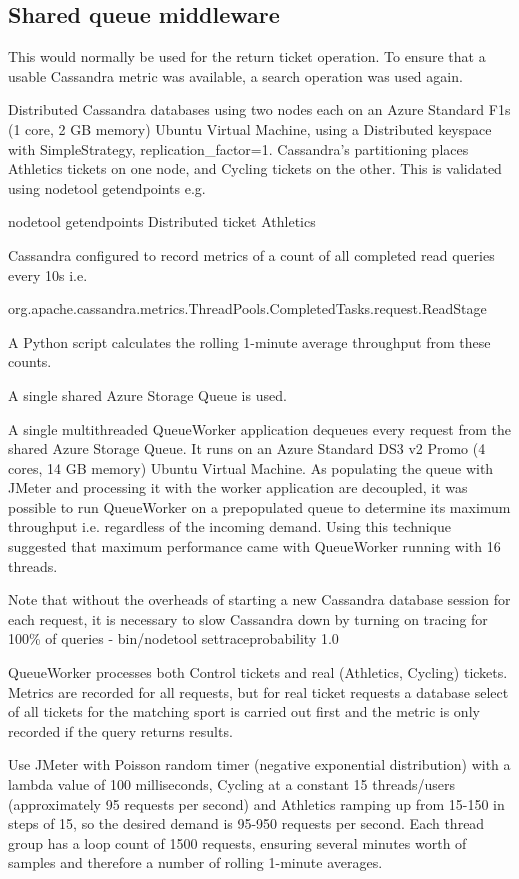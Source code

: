\subsection{Shared queue middleware}
\begin{shaded}
This would normally be used for the return ticket operation.  To ensure that a usable Cassandra metric was available, a search operation was used again.

Distributed Cassandra databases using two nodes each on an Azure Standard F1s (1 core, 2 GB memory) Ubuntu Virtual Machine, using a Distributed keyspace with SimpleStrategy, replication\_factor=1.  Cassandra's partitioning places Athletics tickets on one node, and Cycling tickets on the other.  This is validated using nodetool getendpoints e.g.

nodetool getendpoints Distributed ticket Athletics

Cassandra configured to record metrics of a count of all completed read queries every 10s i.e.

org.apache.cassandra.metrics.ThreadPools.CompletedTasks.request.ReadStage

A Python script calculates the rolling 1-minute average throughput from these counts.

A single shared Azure Storage Queue is used.

A single multithreaded QueueWorker application dequeues every request from the shared Azure Storage Queue.  It runs on an Azure Standard DS3 v2 Promo (4 cores, 14 GB memory) Ubuntu Virtual Machine.  As populating the queue with JMeter and processing it with the worker application are decoupled, it was possible to run QueueWorker on a prepopulated queue to determine its maximum throughput i.e. regardless of the incoming demand. Using this technique suggested that maximum performance came with QueueWorker running with 16 threads.

Note that without the overheads of starting a new Cassandra database session for each request, it is necessary to slow Cassandra down by turning on tracing for 100\% of queries - bin/nodetool settraceprobability 1.0

QueueWorker processes both Control tickets and real (Athletics, Cycling) tickets.  Metrics are recorded for all requests, but for real ticket requests a database select of all tickets for the matching sport is carried out first and the metric is only recorded if the query returns results.

Use JMeter with Poisson random timer (negative exponential distribution) with a lambda value of 100 milliseconds, Cycling at a constant 15 threads/users (approximately 95 requests per second) and Athletics ramping up from 15-150 in steps of 15, so the desired demand is 95-950 requests per second.  Each thread group has a loop count of 1500 requests, ensuring several minutes worth of samples and therefore a number of rolling 1-minute averages.


\end{shaded}
